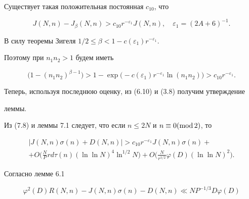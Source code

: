 \begin{lems}


Существует такая положительная постоянная $c_{10}$, что


$$


J(N,n)-J_\beta(N,n) >c_{10}r^{-\varepsilon_1}J(N,n),\quad 


\varepsilon_1= (2A+6)^{-1}.


$$


\end{lems}





\begin{pf}


В силу теоремы Зигеля $1/2\le\beta<1-c(\varepsilon_1)r^{-\varepsilon_1}$.


Поэтому при $n_1n_2>1$ будем иметь


$$


\big(1-(n_1n_2)^{\beta-1}\big)>1-


\exp\big(-c(\varepsilon_1)r^{-\varepsilon_1}\ln(n_1n_2)\big)


>c_{10}r^{-\varepsilon_1}.


$$


Теперь, используя последнюю оценку, из (6.10) и (3.8) получим утверждение


леммы.


\end{pf}





Из (7.8) и леммы 7.1 следует, что если $n\le 2N$ и $n\equiv 0(\operatorname{mod} 2)$, то


\begin{multline}


|J(N,n)\sigma(n)+D(N,n)|>c_{10}r^{-\varepsilon_1}J(N,n)\sigma(n)+ \\


%


+ O\bigg(\frac{N}{P}r d \tau(n)(\ln\ln N)^4\ln^{1/2}N\bigg)+


O\bigg(\frac{N}{r^{1/2}}\varphi(D)(\ln\ln N)^2\bigg).


\end{multline}


Согласно лемме 6.1


\begin{equation}


\varphi^2(D)R(N,n)- J(N,n)\sigma(n)-D(N,n)\ll NP^{-1/3}D\varphi(D)


\end{equation}



